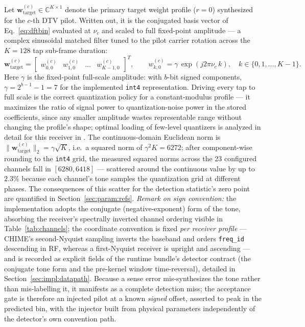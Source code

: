 Let $\mathbf{w}_{\text{target}}^{(c)} \in \mathbb{C}^{K \times 1}$ denote the primary target weight profile ($r = 0$) synthesized for the $c$-th DTV pilot. Written out, it is the conjugated basis vector of Eq.~\eqref{eq:dftbin} evaluated at $\nu_c$ and scaled to full fixed-point amplitude --- a complex sinusoidal matched filter tuned to the pilot carrier rotation across the $K = 128$ tap sub-frame duration:
\begin{equation}
\mathbf{w}_{\text{target}}^{(c)} = \begin{bmatrix}
w_{0,0}^{(c)} & w_{1,0}^{(c)} & \dots & w_{K-1,0}^{(c)}
\end{bmatrix}^T,
\qquad
w_{k,0}^{(c)} = \gamma \, \exp\left(j 2\pi \nu_c \, k\right), \quad k \in \{0, 1, \dots, K-1\}.
\end{equation}
Here $\gamma$ is the fixed-point full-scale amplitude: with $b$-bit signed components, $\gamma = 2^{b-1} - 1 = 7$ for the implemented \texttt{int4} representation. Driving every tap to full scale is the correct quantization policy for a constant-modulus profile --- it maximizes the ratio of signal power to quantization-noise power in the stored coefficients, since any smaller amplitude wastes representable range without changing the profile's shape; optimal loading of few-level quantizers is analyzed in detail for this receiver in \cite{menaparra2018}. The continuous-domain Euclidean norm is $\|\mathbf{w}_{\text{target}}^{(c)}\|_2 = \gamma \sqrt{K}$, i.e.\ a squared norm of $\gamma^2 K = 6272$; after component-wise rounding to the \texttt{int4} grid, the measured squared norms across the 23 configured channels fall in $[6280, 6418]$ --- scattered around the continuous value by up to $2.3\%$ because each channel's tone samples the quantization grid at different phases. The consequences of this scatter for the detection statistic's zero point are quantified in Section~\ref{sec:param:refs}. \textit{Remark on sign convention:} the implementation adopts the conjugate (negative-exponent) form of the tone, absorbing the receiver's spectrally inverted channel ordering visible in Table~\ref{tab:channels}; the coordinate convention is fixed \emph{per receiver profile} --- CHIME's second-Nyquist sampling inverts the baseband and orders \texttt{freq\_id} descending in RF, whereas a first-Nyquist receiver is upright and ascending --- and is recorded as explicit fields of the runtime bundle's detector contract (the conjugate tone form and the pre-kernel window time-reversal), detailed in Section~\ref{sec:impl:datapath}. Because a sense error mis-synthesizes the tone rather than mis-labelling it, it manifests as a complete detection miss; the acceptance gate is therefore an injected pilot at a known \emph{signed} offset, asserted to peak in the predicted bin, with the injector built from physical parameters independently of the detector's own convention path.

